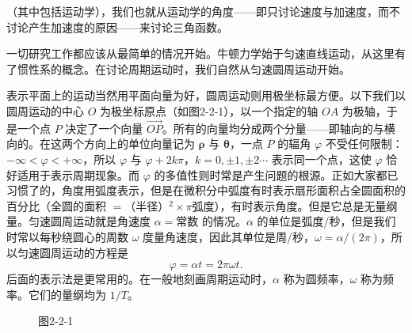 （其中包括运动学），我们也就从运动学的角度——即只讨论速度与加速度，而不讨论产生加速度的原因——来讨论三角函数。

一切研究工作都应该从最简单的情况开始。牛顿力学始于匀速直线运动，从这里有了惯性系的概念。在讨论周期运动时，我们自然从匀速圆周运动开始。

表示平面上的运动当然用平面向量为好，圆周运动则用极坐标最方便。以下我们以圆周运动的中心 $O$ 为极坐标原点（如图2-2-1），以一个指定的轴 $OA$ 为极轴，于是一个点 $P$ 决定了一个向量 $\overrightarrow{OP}$。所有的向量均分成两个分量——即轴向的与横向的。在这两个方向上的单位向量记为 $\boldsymbol\rho$ 与 $\boldsymbol\theta$，一点 $P$ 的辐角 $\varphi$ 不受任何限制：$-\infty<\varphi<+\infty$，所以 $\varphi$ 与 $\varphi+2k\pi$，$k=0,\pm1,\pm2\cdots$ 表示同一个点，这使 $\varphi$ 恰好适用于表示周期现象。而 $\varphi$ 的多值性则时常是产生问题的根源。正如大家都已习惯了的，角度用弧度表示，但是在微积分中弧度有时表示扇形面积占全圆面积的百分比（全圆的面积 $=$（半径）$^2\times\pi$弧度），有时表示角度。但是它总是无量纲量。匀速圆周运动就是角速度 $\alpha=\text{常数}$ 的情况。$\alpha$ 的单位是弧度/秒，但是我们时常以每秒绕圆心的周数 $\omega$ 度量角速度，因此其单位是周/秒，$\omega=\alpha/(2\pi)$，所以匀速圆周运动的方程是
\[
\varphi=\alpha t=2\pi\omega t. \tag{1}
\]
后面的表示法是更常用的。在一般地刻画周期运动时，$\alpha$ 称为圆频率，$\omega$ 称为频率。它们的量纲均为 $1/T$。

\begin{figure}[htbp]
\centering
{}
\caption*{图2-2-1}
\end{figure}

